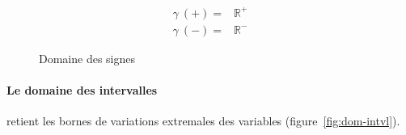 \begin{figure}%
\centering
{}

\begin{align*}
\gamma~(+) = & \mathbb{R}^+ \\
\gamma~(-) = & \mathbb{R}^-
\end{align*}

\caption{Domaine des signes}
\label{fig:dom-sig}
\end{figure}%

\paragraph{Le domaine des intervalles} retient les bornes de variations
extremales des variables (figure~\ref{fig:dom-intvl}).

